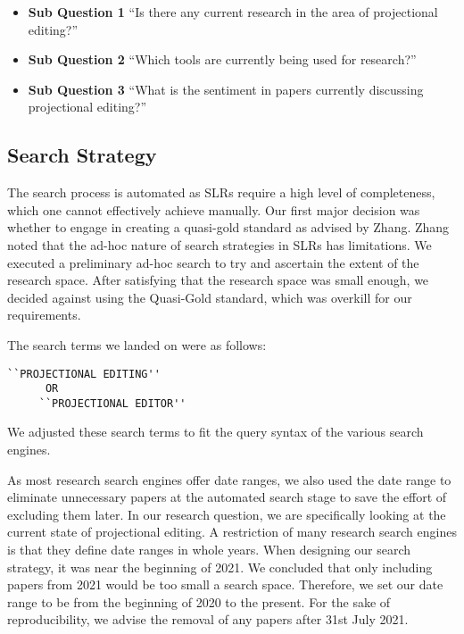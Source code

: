 \begin{itemize}
    \setlength\itemsep{0em}
    \item \textbf{Sub Question 1} ``Is there any current research in the area of projectional editing?''
    \item \textbf{Sub Question 2} ``Which tools are currently being used for research?''
    \item \textbf{Sub Question 3} ``What is the sentiment in papers currently discussing projectional editing?''
\end{itemize}


\subsection{Search Strategy}

The search process is automated as SLRs require a high level of completeness, which one cannot effectively achieve manually.
Our first major decision was whether to engage in creating a quasi-gold standard as advised by Zhang\cite{Zhang_2011}.
Zhang noted that the ad-hoc nature of search strategies in SLRs has limitations.
We executed a preliminary ad-hoc search to try and ascertain the extent of the research space.
After satisfying that the research space was small enough, we decided against using the Quasi-Gold standard, which was overkill for our requirements.

The search terms we landed on were as follows:
\begin{lstlisting}[frame=none]
     ``PROJECTIONAL EDITING'' 
      OR 
     ``PROJECTIONAL EDITOR'' 
\end{lstlisting}

We adjusted these search terms to fit the query syntax of the various search engines.

As most research search engines offer date ranges, we also used the date range to eliminate unnecessary papers at the automated search stage to save the effort of excluding them later.
In our research question, we are specifically looking at the current state of projectional editing.
A restriction of many research search engines is that they define date ranges in whole years.
When designing our search strategy, it was near the beginning of 2021.
We concluded that only including papers from 2021 would be too small a search space. 
Therefore, we set our date range to be from the beginning of 2020 to the present.
For the sake of reproducibility, we advise the removal of any papers after 31st July 2021.

